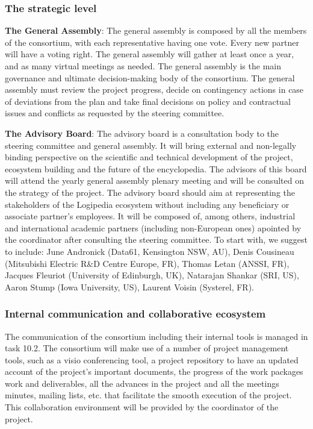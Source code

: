 \subsubsection*{The strategic level}

\begin{compactitem}
\item{\bf The General Assembly}: The general assembly is composed by all
the members of the consortium, with each representative having one
vote. Every new partner will have a voting right. The general assembly
will gather at least once a year, and as many virtual meetings as
needed. The general assembly is the main governance and ultimate
decision-making body of the consortium. The general assembly must
review the project progress, decide on contingency actions in case of
deviations from the plan and take final decisions on policy and
contractual issues and conflicts as requested by the steering
committee.

\item{\bf The Advisory Board}: The advisory board is a consultation body to
the steering committee and general assembly. It will bring external
and non-legally binding perspective on the scientific and technical
development of the project, ecosystem building and the future of the
encyclopedia. The advisors of this board will attend the yearly
general assembly plenary meeting and will be consulted on the strategy
of the project. The advisory board should aim at representing the
stakeholders of the Logipedia ecosystem without including any
beneficiary or associate partner’s employees. It will be composed of,
among others, industrial and international academic partners
(including non-European ones) apointed by the coordinator after
consulting the steering committee. To start with, we suggest to
include: June Andronick (Data61, Kensington NSW, AU), Denis Cousineau
(Mitsubishi Electric R\&D Centre Europe, FR), Thomas Letan (ANSSI, FR),
Jacques Fleuriot (University of Edinburgh, UK), Natarajan Shankar
(SRI, US), Aaron Stump (Iowa University, US), Laurent Voisin
(Systerel, FR).
\end{compactitem}

 \subsubsection*{Internal communication and collaborative ecosystem}

The communication of the consortium including their internal tools is
managed in task 10.2.  The consortium will make use of a number of
project management tools, such as a visio conferencing tool, a project
repository to have an updated account of the project’s important
documents, the progress of the work packages work and deliverables,
all the advances in the project and all the meetings minutes, mailing
lists, etc. that facilitate the smooth execution of the project. This
collaboration environment will be provided by the coordinator of the
project.

